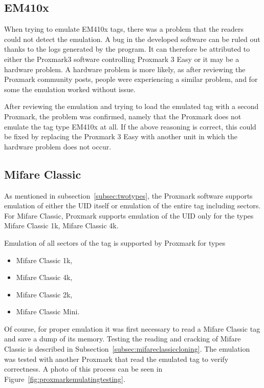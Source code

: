 \subsection{EM410x}

When trying to emulate EM410x tags, there was a problem that the readers could not detect the emulation. A bug in the developed software can be ruled out thanks to the logs generated by the program. It can therefore be attributed to either the Proxmark3 software controlling Proxmark 3 Easy or it may be a hardware problem. A hardware problem is more likely, as after reviewing the Proxmark community posts, people were experiencing a similar problem, and for some the emulation worked without issue.

After reviewing the emulation and trying to load the emulated tag with a second Proxmark, the problem was confirmed, namely that the Proxmark does not emulate the tag type EM410x at all. If the above reasoning is correct, this could be fixed by replacing the Proxmark 3 Easy with another unit in which the hardware problem does not occur.


\subsection{Mifare Classic}
As mentioned in subsection~\ref{subsec:twotypes}, the Proxmark software supports emulation of either the UID itself or emulation of the entire tag including sectors. For Mifare Classic, Proxmark supports emulation of the UID only for the types Mifare Classic 1k, Mifare Classic 4k.

Emulation of all sectors of the tag is supported by Proxmark for types

\begin{itemize}
    \item Mifare Classic 1k,
    \item Mifare Classic 4k,
    \item Mifare Classic 2k,
    \item Mifare Classic Mini.
\end{itemize}

Of course, for proper emulation it was first necessary to read a Mifare Classic tag and save a dump of its memory. Testing the reading and cracking of Mifare Classic is described in Subsection~\ref{subsec:mifareclassiccloning}. The emulation was tested with another Proxmark that read the emulated tag to verify correctness. A photo of this process can be seen in Figure~\ref{fig:proxmarkemulatingtesting}.


